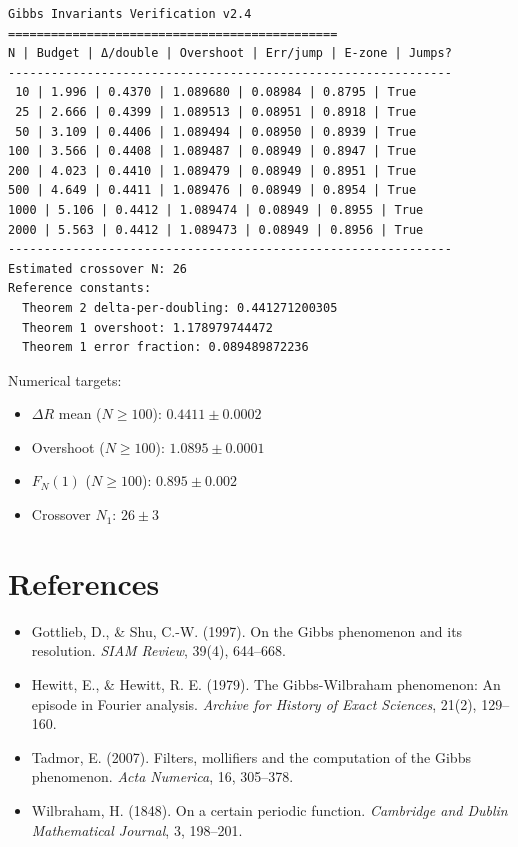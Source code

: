 \documentclass[11pt,letterpaper]{article}
\theoremstyle{remark}
\begin{document}
\begin{verbatim}
Gibbs Invariants Verification v2.4
==============================================
N | Budget | Δ/double | Overshoot | Err/jump | E-zone | Jumps?
--------------------------------------------------------------
 10 | 1.996 | 0.4370 | 1.089680 | 0.08984 | 0.8795 | True
 25 | 2.666 | 0.4399 | 1.089513 | 0.08951 | 0.8918 | True
 50 | 3.109 | 0.4406 | 1.089494 | 0.08950 | 0.8939 | True
100 | 3.566 | 0.4408 | 1.089487 | 0.08949 | 0.8947 | True
200 | 4.023 | 0.4410 | 1.089479 | 0.08949 | 0.8951 | True
500 | 4.649 | 0.4411 | 1.089476 | 0.08949 | 0.8954 | True
1000 | 5.106 | 0.4412 | 1.089474 | 0.08949 | 0.8955 | True
2000 | 5.563 | 0.4412 | 1.089473 | 0.08949 | 0.8956 | True
--------------------------------------------------------------
Estimated crossover N: 26
Reference constants:
  Theorem 2 delta-per-doubling: 0.441271200305
  Theorem 1 overshoot: 1.178979744472
  Theorem 1 error fraction: 0.089489872236
\end{verbatim}

Numerical targets:
\begin{itemize}[nosep]
\item $\Delta R$ mean ($N \ge 100$): $0.4411 \pm 0.0002$
\item Overshoot ($N \ge 100$): $1.0895 \pm 0.0001$
\item $F_N(1)$ ($N \ge 100$): $0.895 \pm 0.002$
\item Crossover $N_1$: $26 \pm 3$
\end{itemize}

\section*{References}

\begin{itemize}[label={},leftmargin=0pt]
\item Gottlieb, D., \& Shu, C.-W. (1997). On the Gibbs phenomenon and its resolution. \textit{SIAM Review}, 39(4), 644--668.
\item Hewitt, E., \& Hewitt, R. E. (1979). The Gibbs-Wilbraham phenomenon: An episode in Fourier analysis. \textit{Archive for History of Exact Sciences}, 21(2), 129--160.
\item Tadmor, E. (2007). Filters, mollifiers and the computation of the Gibbs phenomenon. \textit{Acta Numerica}, 16, 305--378.
\item Wilbraham, H. (1848). On a certain periodic function. \textit{Cambridge and Dublin Mathematical Journal}, 3, 198--201.
\end{itemize}
\end{document}
